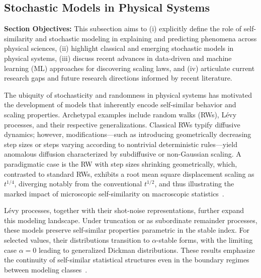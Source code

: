 \documentclass[sigconf]{acmart}
\begin{document}
\subsection{Stochastic Models in Physical Systems}

\textbf{Section Objectives:} This subsection aims to (i) explicitly define the role of self-similarity and stochastic modeling in explaining and predicting phenomena across physical sciences, (ii) highlight classical and emerging stochastic models in physical systems, (iii) discuss recent advances in data-driven and machine learning (ML) approaches for discovering scaling laws, and (iv) articulate current research gaps and future research directions informed by recent literature.

The ubiquity of stochasticity and randomness in physical systems has motivated the development of models that inherently encode self-similar behavior and scaling properties. Archetypal examples include random walks (RWs), Lévy processes, and their respective generalizations. Classical RWs typify diffusive dynamics; however, modifications—such as introducing geometrically decreasing step sizes or steps varying according to nontrivial deterministic rules—yield anomalous diffusion characterized by subdiffusive or non-Gaussian scaling. A paradigmatic case is the RW with step sizes shrinking geometrically, which, contrasted to standard RWs, exhibits a root mean square displacement scaling as $t^{1/4}$, diverging notably from the conventional $t^{1/2}$, and thus illustrating the marked impact of microscopic self-similarity on macroscopic statistics~\cite{ref57}.

Lévy processes, together with their shot-noise representations, further expand this modeling landscape. Under truncation or as subordinate remainder processes, these models preserve self-similar properties parametric in the stable index. For selected values, their distributions transition to $\alpha$-stable forms, with the limiting case $\alpha = 0$ leading to generalized Dickman distributions. These results emphasize the continuity of self-similar statistical structures even in the boundary regimes between modeling classes~\cite{ref62}.
\end{document}
